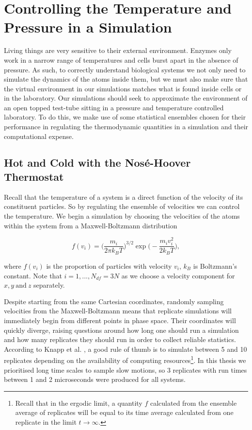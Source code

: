 \section{Controlling the Temperature and Pressure in a Simulation}
Living things are very sensitive to their external environment. Enzymes only work in a narrow range of temperatures and cells burst apart in the absence of pressure\cite{peterson2007, song2012}. As such, to correctly understand biological systems we not only need to simulate the dynamics of the atoms inside them, but we must also make sure that the virtual environment in our simulations matches what is found inside cells or in the laboratory. Our simulations should seek to approximate the environment of an open topped test-tube sitting in a pressure and temperature controlled laboratory. To do this, we make use of some statistical ensembles chosen for their performance in regulating the thermodynamic quantities in a simulation and their computational expense.  


\subsection{Hot and Cold with the Nos\'e-Hoover Thermostat}
Recall that the temperature of a system is a direct function of the velocity of its constituent particles. So by regulating the ensemble of velocities we can control the temperature. We begin a simulation by choosing the velocities of the atoms within the system from a Maxwell-Boltzmann distribution 

\begin{equation}
	f(v_i) = \Big(\frac{m_i}{2\pi k_B T}\Big)^{3/2} \exp{\Big(-\frac{m_iv_i^2}{2k_BT}\Big)},
\end{equation}

where $f(v_i)$ is the proportion of particles with velocity $v_i$, $k_B$ is Boltzmann's constant. Note that $i=1,...,N_{df}=3N$ as we choose a velocity component for $x,y \ \text{and}\  z$ separately. 

Despite starting from the same Cartesian coordinates, randomly sampling velocities from the Maxwell-Boltzmann means that replicate simulations will immediately begin from different points in phase space. Their coordinates will quickly diverge, raising questions around how long one should run a simulation and how many replicates they should run in order to collect reliable statistics. According to Knapp et al. \cite{knapp2018}, a good rule of thumb is to simulate between 5 and 10 replicates depending on the availability of computing resources\footnote{Recall that in the ergodic limit, a quantity $f$ calculated from the ensemble average of replicates will be equal to its time average calculated from one replicate in the limit $t\to\infty.$}. In this thesis we prioritised long time scales to sample slow motions, so 3 replicates with run times between 1 and 2 microseconds were produced for all systems. 

